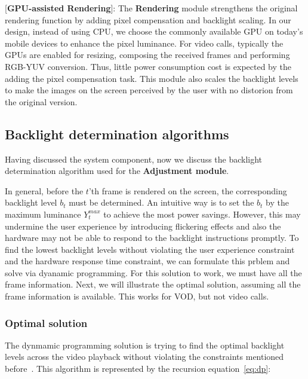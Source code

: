 [{\bf GPU-assisted Rendering}]:
The {\bf Rendering} module strengthens the original rendering function by
adding pixel compensation and backlight scaling.  In our design,
instead of using CPU, we choose the commonly available GPU on today's
mobile devices to enhance the pixel luminance.  For video calls,
typically the GPUs are enabled for resizing, composing the received
frames and performing RGB-YUV conversion. Thus,  little power consumption
cost is expected by the adding the pixel compensation task. This
module also scales the backlight levels to make the images on the
screen perceived by the user with no distorion from the original
version.

\subsection{Backlight determination algorithms}
Having discussed the system component, now we discuss the backlight
determination algorithm used for the {\bf Adjustment module}.

In general, before the $t$'th frame is rendered on the screen, the corresponding
backlight level $b_t$ must be determined. An intuitive way is to set
the $b_t$ by the maximum luminance $Y_{t}^{max}$ to achieve the most
power savings. However, this may undermine the user experience by
introducing flickering effects and also the hardware may not be able
to respond to the backlight instructions promptly.  To find the lowest
backlight levels without violating the user experience constraint and
the hardware response time constraint, we can formulate this prblem
and solve via dyanamic programming.  For this solution to work, we
must have all the frame information.
Next, we will illustrate the optimal solution, assuming all the frame
information is available. This works for VOD, but not video calls. 


\subsubsection{Optimal solution}
The dynmamic programming solution is trying to find the optimal
backlight levels across the video playback without violating the
constraints mentioned before~\cite{CAD}. 
This algorithm is represented by the
recursion equation~\ref{eq:dp}:

